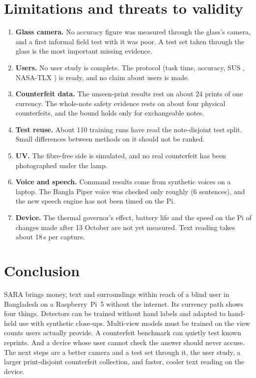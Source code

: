 \documentclass[preprint,12pt]{elsarticle}
\begin{document}
\section{Limitations and threats to validity}
\label{sec:limits}
\begin{enumerate}
\item \textbf{Glass camera.} No accuracy figure was measured through the glass's camera, and a first informal field test with it was poor. A test set taken through the glass is the most important missing evidence.
\item \textbf{Users.} No user study is complete. The protocol (task time, accuracy, SUS \cite{sus}, NASA-TLX \cite{nasatlx}) is ready, and no claim about users is made.
\item \textbf{Counterfeit data.} The unseen-print results rest on about 24 prints of one currency. The whole-note safety evidence rests on about four physical counterfeits, and the bound holds only for exchangeable notes.
\item \textbf{Test reuse.} About 110 training runs have read the note-disjoint test split. Small differences between methods on it should not be ranked.
\item \textbf{UV.} The fibre-free side is simulated, and no real counterfeit has been photographed under the lamp.
\item \textbf{Voice and speech.} Command results come from synthetic voices on a laptop. The Bangla Piper voice was checked only roughly (6 sentences), and the new speech engine has not been timed on the Pi.
\item \textbf{Device.} The thermal governor's effect, battery life and the speed on the Pi of changes made after 13 October are not yet measured. Text reading takes about 18\,s per capture.
\end{enumerate}

\section{Conclusion}
\label{sec:conclusion}
SARA brings money, text and surroundings within reach of a blind user in Bangladesh on a Raspberry~Pi~5 without the internet. Its currency path shows four things. Detectors can be trained without hand labels and adapted to hand-held use with synthetic close-ups. Multi-view models must be trained on the view counts users actually provide. A counterfeit benchmark can quietly test known reprints. And a device whose user cannot check the answer should never accuse. The next steps are a better camera and a test set through it, the user study, a larger print-disjoint counterfeit collection, and faster, cooler text reading on the device.
\end{document}
